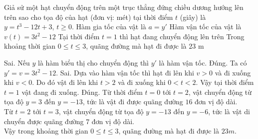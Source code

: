 \begin{ex}%
Giả sử một hạt chuyển động trên một trục thẳng đứng chiều dương hướng lên trên sao cho tọa độ của hạt (đơn vị: mét) tại thời điểm $t$ (giây) là $y=t^3-12t+3$, $t\geq0$.
\choiceTF
{Hàm gia tốc của vật là $a=y'$}
{\True Hàm vận tốc của vật là $v(t)=3t^2-12$}
{Tại thời điểm $t=1$ thì hạt đang chuyển động lên trên}
{\True Trong khoảng thời gian $0\leq t \leq 3$, quãng đường mà hạt đi được là $23$ m}
\loigiai
{
\begin{itemchoice}
\itemch Sai. Nếu $y$ là hàm biểu thị cho chuyển động thì $y'$ là hàm vận tốc.
\itemch Đúng. Ta có $y'=v=3t^2-12$.
\itemch Sai. Dựa vào hàm vận tốc thì hạt đi lên khi $v>0$ và đi xuống khi $v<0$. Do đó vật đi lên khi $t>2$ và đi xuống khi $0<t<2$. Vậy tại thời điểm $t=1$ vật đang đi xuống.
\itemch Đúng. Từ thời điểm $t=0$ tới $t=2$, vật chuyển động từ tọa độ $y=3$ đến $y=-13$, tức là vật đi được quãng đường $16$ đơn vị độ dài. \\
Từ $t=2$ tới $t=3$, vật chuyển động từ tọa độ $y=-13$ đến $y=-6$, tức là vật di chuyển được quãng đường $7$ đơn vị độ dài. \\
Vậy trong khoảng thời gian $0\leq t \leq 3$, quãng đường mà hạt đi được là $23m$.
\end{itemchoice}
}
\end{ex}

